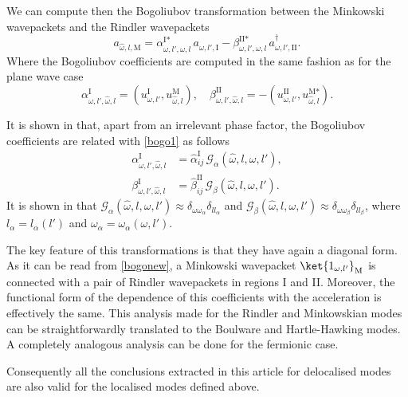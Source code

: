  We can compute then the Bogoliubov transformation between the Minkowski wavepackets and the Rindler wavepackets \cite{NavarroSalas}
 \begin{equation}
a_{\hat\omega,l,\text{M}}=\alpha^{\text{I}*}_{\omega,l',\hat \omega,l}\,
a^{\phantom{\dagger}}_{\omega,l',\text{I}}-\beta^{\text{II}*}_{\omega,l',\hat \omega,l}\,
a^\dagger_{\omega,l',\text{II}}.
\end{equation}
Where the Bogoliubov coefficients are computed in the same fashion as for the plane wave case
\begin{equation}
\alpha^{\text{I}}_{\omega,l',\hat \omega,l}=\left(u^{\text{I}}_{\omega,l'},u^{\text{M}}_{\hat\omega,l}\right),
\quad\beta^{\text{II}}_{\omega,l',\hat \omega,l}=-\left(u^{\text{II}}_{\omega,l'},u^{\text{M}*}_{\hat\omega,l}\right).
\end{equation}

It is shown in \cite{NavarroSalas} that, apart from an irrelevant phase factor, the Bogoliubov coefficients are related with \eqref{bogo1} as follows
\begin{align}\label{bogonew}
\nonumber\alpha^{\text{I}}_{\omega,l',\hat \omega,l}&=\hat\alpha^{\text{I}}_{ij}\,\mathcal{G}_\alpha(\hat\omega,l,\omega,l'),\\
\beta^{\text{I}}_{\omega,l',\hat \omega,l}&=\hat\beta^{\text{II}}_{ij}\,\mathcal{G}_\beta(\hat\omega,l,\omega,l').
\end{align}
It is shown in \cite{NavarroSalas} that $\mathcal{G}_\alpha(\hat\omega,l,\omega,l')\approx \delta_{\omega\omega_\alpha}\delta_{ll_\alpha}$ and  $\mathcal{G}_\beta(\hat\omega,l,\omega,l')\approx \delta_{\omega\omega_\beta}\delta_{ll_\beta}$, where $l_\alpha=l_\alpha(l')$ and $\omega_\alpha =\omega_\alpha( \omega,l')$.

The key feature of this transformations is that they have again a diagonal form. As it can be read from \eqref{bogonew}, a Minkowski wavepacket $\ket{1_{\omega,l'}}_\text{M}$ is connected with a pair of Rindler wavepackets in regions I and II. Moreover, the functional form of the dependence of this coefficients with the acceleration is effectively the same. This analysis made for the Rindler and Minkowskian modes can be straightforwardly translated to the Boulware and Hartle-Hawking modes.  A completely analogous analysis can be done for the fermionic case.

Consequently all the conclusions extracted in this article for delocalised modes are also valid for the localised modes defined above.

